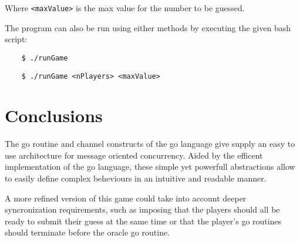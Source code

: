 \documentclass[12pt, a4paper]{report}
\begin{document}
Where \verb|<maxValue>| is the max value for the number to be guessed.

The program can also be run using either methods by executing the given bash script:
\begin{lstlisting}
    $ ./runGame
\end{lstlisting}
\begin{lstlisting}
    $ ./runGame <nPlayers> <maxValue>
\end{lstlisting}

\chapter{Conclusions}
The go routine and channel constructs of the go language give supply an easy to use architecture for message oriented concurrency. Aided by the efficent
 implementation of the go language, these simple yet powerfull abstractions allow to easily define complex beheviours in an intuitive
 and readable manner. 

A more refined version of this game could take into account deeper syncronization requirements, such as imposing that the players should all
 be ready to submit their guess at the same time or that the player's go routines should terminate before the oracle go routine.



\end{document}
